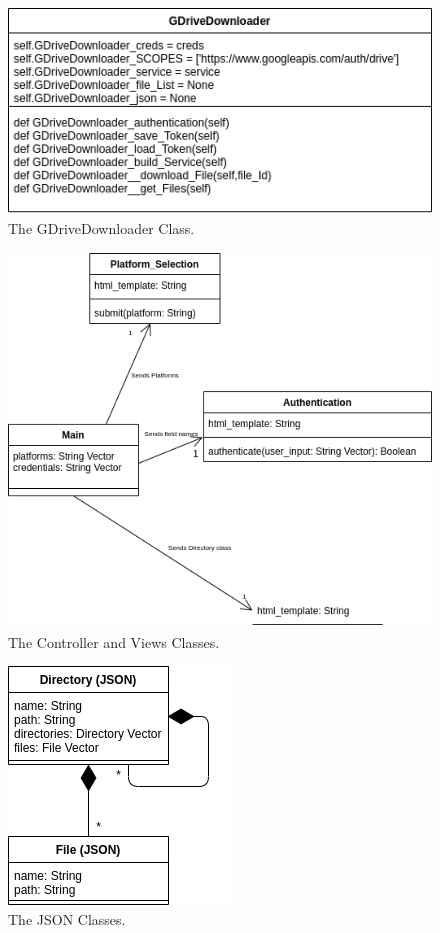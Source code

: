 \documentclass{article}
\begin{document}
\begin{figure}[p]
\includegraphics[scale=.5]{des_google}
\centering
\caption{The GDriveDownloader Class.}
\end{figure}

\begin{figure}[p]
\includegraphics[scale=.5]{des_views}
\centering
\caption{The Controller and Views Classes.}
\end{figure}

\begin{figure}[p]
\includegraphics[scale=.5]{des_json}
\centering
\caption{The JSON Classes.}
\end{figure}
\end{document}
